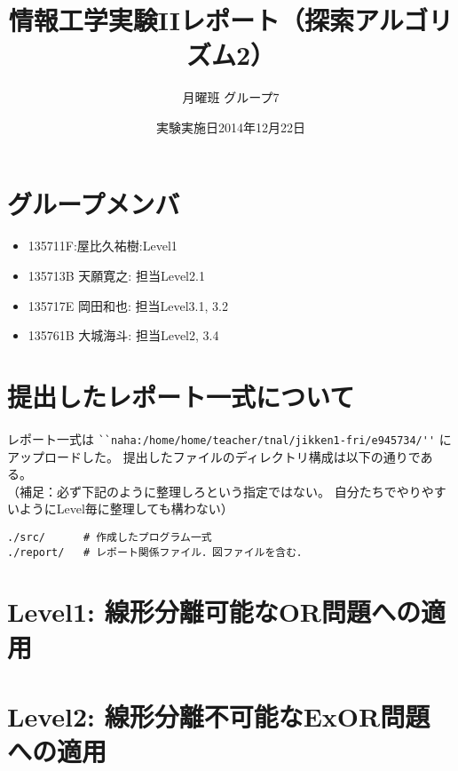 \documentclass[10pt]{jarticle}
\begin{document}
\title{情報工学実験IIレポート（探索アルゴリズム2）}
\author{ 月曜班  グループ7} %
\date{実験実施日2014年12月22日}

\maketitle


\section*{グループメンバ}
\begin{itemize}
 \item 135711F:屋比久祐樹:Level1
 \item 135713B 天願寛之: 担当Level2.1
 \item 135717E 岡田和也: 担当Level3.1, 3.2
 \item 135761B 大城海斗: 担当Level2, 3.4
\end{itemize}

\section*{提出したレポート一式について}
レポート一式は
\verb|``naha:/home/home/teacher/tnal/jikken1-fri/e945734/''|
にアップロードした。
提出したファイルのディレクトリ構成は以下の通りである。\\
（補足：必ず下記のように整理しろという指定ではない。
自分たちでやりやすいようにLevel毎に整理しても構わない）
\begin{breakbox}
\begin{verbatim}
./src/      # 作成したプログラム一式
./report/   # レポート関係ファイル．図ファイルを含む．
\end{verbatim}
\end{breakbox}

\newpage

\section{Level1: 線形分離可能なOR問題への適用}


\newpage

\section{Level2: 線形分離不可能なExOR問題への適用}


\newpage
\end{document}

